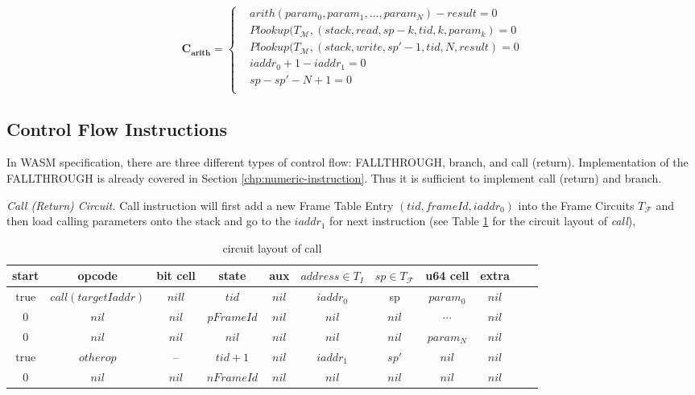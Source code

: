 \begin{equation}
    \mathbf{C_{arith}} = \begin{cases}
        &arith(param_0, param_1, ..., param_N) - result = 0 \\
        &Plookup(T_\mathcal{M}, (stack, read, sp - k, tid, k, param_k) = 0 \\
        &Plookup(T_\mathcal{M}, (stack, write, sp' - 1, tid, N, result) = 0 \\
        &iaddr_0 + 1 - iaddr_1 = 0\\
        &sp - sp' - N + 1 = 0\\
    \end{cases}
\label{eq:cs-arith}
\end{equation}
\subsection{Control Flow Instructions}
In WASM specification, there are three different types of control flow: FALLTHROUGH, branch, and call (return). Implementation of the FALLTHROUGH is already covered in Section \ref{chp:numeric-instruction}. Thus it is sufficient to implement call (return) and branch.

\smallskip\noindent\emph{Call (Return) Circuit.}
Call instruction will first add a new Frame Table Entry $(tid, frameId, iaddr_0)$ into the Frame Circuits $T_\mathcal{F}$ and then load calling parameters onto the stack and go to the $iaddr_1$ for next instruction (see Table \ref{tbl:call-instruction} for the circuit layout of \emph{call}),
\begin{table}[!h]
\begin{center}
\begin{tabular}{ | c | c | c | c | c | c | c | c | c | c | c | }
  \hline
  start & opcode & bit cell & state & aux & $address \in T_{I}$ & $sp \in T_\mathcal{F}$& u64 cell & extra \\ 
  \hline
   true & $call(targetIaddr)$ & $nill$ & $tid$ & $nil$ & $iaddr_0$ & sp & $param_0$ & $nil$\\ 
 \hline
   0 & $nil$ & $nil$ & $pFrameId$ & $nil$ & $nil$ & $nil$ & $\cdots$ & $nil$\\ 
 \hline
   0 & $nil$ & $nil$ & $nil$ & $nil$ & $nil$ & $nil$ & $param_N$ & $nil$\\ 
 \hline
   true & $otherop$ & -- & $tid + 1$ & $nil$ & $iaddr_1$ & $sp'$ & $nil$ & $nil$\\
 \hline
   0 & $nil$ & $nil$ & $nFrameId$ & $nil$ & $nil$ & $nil$ & $nil$ & $nil$\\ 
 \hline
\end{tabular}
\caption{circuit layout of call}
\label{tbl:call-instruction}
\end{center}
\end{table}

